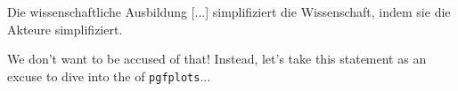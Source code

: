 \epigraph{Die wissenschaftliche Ausbildung [...] simplifiziert die \frqq Wissenschaft\flqq, indem sie die Akteure simplifiziert.}{}

We don’t want to be accused of that! Instead, let’s take this statement as an excuse to dive into the  of \verb|pgfplots|... 